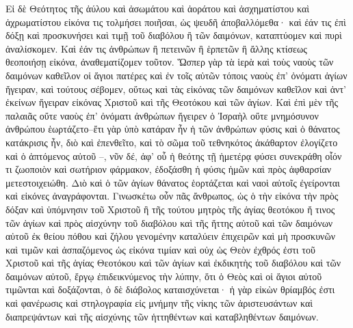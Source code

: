 \documentclass[10pt]{book}
\newcommand{\switchEnglish}{\selectlanguage{english} \switchcolumn}
\begin{document}
\begin{paracol}{2}
Εἰ δὲ Θεότητος τῆς ἀύλου καὶ ἀσωμάτου καὶ ἀοράτου καὶ ἀσχηματίστου καὶ
ἀχρωματίστου εἰκόνα τις τολμήσει ποιῆσαι, ὡς ψευδῆ ἀποβαλλόμεθα· καὶ ἐάν τις
ἐπὶ δόξῃ καὶ προσκυνήσει καὶ τιμῇ τοῦ διαβόλου ἢ τῶν δαιμόνων, καταπτύομεν καὶ
πυρὶ ἀναλίσκομεν. Καὶ ἐάν τις ἀνθρώπων ἢ πετεινῶν ἢ ἑρπετῶν ἢ ἄλλης κτίσεως
θεοποιήσῃ εἰκόνα, ἀναθεματίζομεν τοῦτον. Ὥσπερ γὰρ τὰ ἱερὰ καὶ τοὺς ναοὺς τῶν
δαιμόνων καθεῖλον οἱ ἅγιοι πατέρες καὶ ἐν τοῖς αὐτῶν τόποις ναοὺς ἐπ’ ὀνόματι
ἁγίων ἤγειραν, καὶ τούτους σέβομεν, οὕτως καὶ τὰς εἰκόνας τῶν δαιμόνων
καθεῖλον καὶ ἀντ’ ἐκείνων ἤγειραν εἰκόνας Χριστοῦ καὶ τῆς Θεοτόκου καὶ τῶν
ἁγίων. Καὶ ἐπὶ μὲν τῆς παλαιᾶς οὔτε ναοὺς ἐπ’ ὀνόματι ἀνθρώπων ἤγειρεν ὁ
Ἰσραὴλ οὔτε μνημόσυνον ἀνθρώπου ἑωρτάζετο–ἔτι γὰρ ὑπὸ κατάραν ἦν ἡ τῶν
ἀνθρώπων φύσις καὶ ὁ θάνατος κατάκρισις ἦν, διὸ καὶ ἐπενθεῖτο, καὶ τὸ σῶμα τοῦ
τεθνηκότος ἀκάθαρτον ἐλογίζετο καὶ ὁ ἁπτόμενος αὐτοῦ –, νῦν δέ, ἀφ’ οὗ ἡ
θεότης τῇ ἡμετέρᾳ φύσει συνεκράθη οἷόν τι ζωοποιὸν καὶ σωτήριον φάρμακον,
ἐδοξάσθη ἡ φύσις ἡμῶν καὶ πρὸς ἀφθαρσίαν μετεστοιχειώθη. Διὸ καὶ ὁ τῶν ἁγίων
θάνατος ἑορτάζεται καὶ ναοὶ αὐτοῖς ἐγείρονται καὶ εἰκόνες ἀναγράφονται.
Γινωσκέτω οὖν πᾶς ἄνθρωπος, ὡς ὁ τὴν εἰκόνα τὴν πρὸς δόξαν καὶ ὑπόμνησιν τοῦ
Χριστοῦ ἢ τῆς τούτου μητρὸς τῆς ἁγίας θεοτόκου ἤ τινος τῶν ἁγίων καὶ πρὸς
αἰσχύνην τοῦ διαβόλου καὶ τῆς ἥττης αὐτοῦ καὶ τῶν δαιμόνων αὐτοῦ ἐκ θείου
πόθου καὶ ζήλου γενομένην καταλύειν ἐπιχειρῶν καὶ μὴ προσκυνῶν καὶ τιμῶν καὶ
ἀσπαζόμενος ὡς εἰκόνα τιμίαν καὶ οὐχ ὡς Θεὸν ἐχθρός ἐστι τοῦ Χριστοῦ καὶ τῆς
ἁγίας Θεοτόκου καὶ τῶν ἁγίων καὶ ἐκδικητὴς τοῦ διαβόλου καὶ τῶν δαιμόνων
αὐτοῦ, ἔργῳ ἐπιδεικνύμενος τὴν λύπην, ὅτι ὁ Θεὸς καὶ οἱ ἅγιοι αὐτοῦ τιμῶνται
καὶ δοξάζονται, ὁ δὲ διάβολος καταισχύνεται· ἡ γὰρ εἰκὼν θρίαμβός ἐστι καὶ
φανέρωσις καὶ στηλογραφία εἰς μνήμην τῆς νίκης τῶν ἀριστευσάντων καὶ
διαπρεψάντων καὶ τῆς αἰσχύνης τῶν ἡττηθέντων καὶ καταβληθέντων δαιμόνων.

\switchEnglish


\end{paracol}
\end{document}
